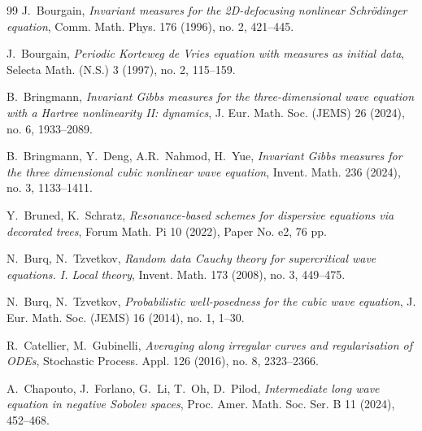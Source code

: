 \documentclass[letterpaper, 11pt,  reqno]{amsart}
\newcommand{\1}{\hspace{0.5mm}\text{I}\hspace{0.5mm}}
\numberwithin{equation}{section}
\numberwithin{theorem}{section}
\begin{document}
\begin{thebibliography}{99}
J.~Bourgain,
{\it Invariant measures for the 2D-defocusing nonlinear Schr\"odinger equation},
Comm. Math. Phys. 176 (1996), no. 2, 421--445.

%
J.~Bourgain, 
{\it Periodic Korteweg de Vries equation with measures as initial data}, 
 Selecta Math. (N.S.) 3 (1997), no. 2, 115--159.
%

%
%
%



B.~Bringmann, 
{\it Invariant Gibbs measures for the three-dimensional wave equation with a Hartree nonlinearity II: dynamics},
 J. Eur. Math. Soc. (JEMS) 26 (2024), no. 6, 1933--2089. 







B.~Bringmann, Y.~Deng, A.R.~Nahmod, H.~Yue, 
{\it Invariant Gibbs measures for the three dimensional cubic nonlinear wave equation},
 Invent. Math. 236 (2024), no. 3, 1133--1411. 


Y.~Bruned, K.~Schratz, 
{\it Resonance-based schemes for dispersive equations via decorated trees},
 Forum Math. Pi 10 (2022), Paper No. e2, 76 pp.





N.~Burq, N.~Tzvetkov, 
{\it Random data Cauchy theory for supercritical wave equations. I. Local theory},
 Invent. Math. 173 (2008), no. 3, 449--475. 


N.~Burq, N.~Tzvetkov, 
{\it Probabilistic well-posedness for the cubic wave equation},
 J. Eur. Math. Soc. (JEMS) 16 (2014), no. 1, 1--30. 
 
 





R.~Catellier, M.~Gubinelli, 
{\it Averaging along irregular curves and regularisation of ODEs}, 
Stochastic Process. Appl. 126 (2016), no. 8, 2323--2366. 






A.~Chapouto, J.~Forlano, G.~Li, T.~Oh, D.~Pilod,
{\it  Intermediate long wave equation in negative Sobolev spaces},
 Proc. Amer. Math. Soc. Ser. B 11 (2024), 452--468.



\end{thebibliography}
\end{document}
